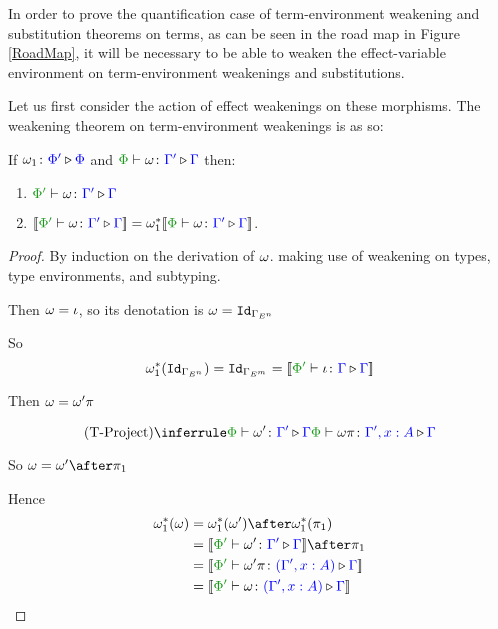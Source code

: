 \documentclass{Report}
\begin{document}
In order to prove the quantification case of term-environment weakening and substitution theorems on terms, as can be seen in the road map in Figure \ref{RoadMap}, it will be necessary to be able to weaken the effect-variable environment on term-environment weakenings and substitutions.

Let us first consider the action of effect weakenings on these morphisms. The weakening theorem on term-environment weakenings is as so:



\begin{framed}
    \begin{theorem}\label{EffectWeakeningOnTermWeakening}
        If $\omega_1 \colon {\color{blue}\Phi'} \triangleright {\color {blue} \Phi}$ and $\pewrel{\w}{\G'}{\G}$ then:
        \begin{enumerate}[label=\roman*.]
            \item $\ewrel{\P'}{\w}{\G'}{\G}$
            \item $\deno{\ewrel{\P'}{\w}{\G'}{\G}} = \w_1\star\deno{\pewrel{\w}{\G'}{\G}}$.
        \end{enumerate} 
    \end{theorem}
    
    \begin{proof}
        By induction on the derivation of $\omega$. making use of weakening on types, type environments, and subtyping.
    
        \case{\tid}
        Then $\omega = \iota$, so its denotation is $\omega = \texttt{Id}_{\Gamma_{E^n}}$
        
        So
        \begin{equation}
          \w_1\star(\Id{\G_{E^n}}) = \Id{\G_{E^m}} = \deno{\ewrel{\P'}{\i}{\G}{\G}}  
        \end{equation}
        
        \case{\tproject}
        Then $\omega = \omega'\pi$
        
        \begin{equation}
            \ntreeruleI{\tproject}{\ewrel{\P}{\w'}{\G'}{\G}}{\ewrel{\P}{\w\pi}{\G',x:A}{\G}}
        \end{equation}
        
        So $\w = \w'\after\p$
        
        Hence
        \begin{align*}
            \w_1\star(\w) &= \w_1\star(\w')\after\w_1\star(\p)\\
            & = \deno{\ewrel{\P'}{\w'}{\G'}{\G}}\after\p\\
            & = \deno{\ewrel{\P'}{\w'\pi}{(\G',x:A)}{\G}}\\
            & = \deno{\ewrel{\P'}{\w}{(\G', x:A)}{\G}}
        \end{align*}
        

\end{proof}
\end{framed}
\end{document}
